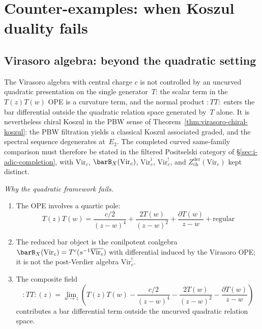 
\section{Counter-examples: when Koszul duality fails}
\label{sec:counter-examples}

\subsection{Virasoro algebra: beyond the quadratic setting}
\label{subsec:virasoro-non-example}

\begin{remark}
The Virasoro algebra with central charge $c$ is not controlled by an
uncurved quadratic presentation on the single generator~$T$: the scalar
term in the $T(z)T(w)$ OPE is a curvature term, and the normal product
$:TT:$ enters the bar differential outside the quadratic relation space
generated by~$T$ alone. It is nevertheless chiral Koszul in the PBW
sense of Theorem~\ref{thm:virasoro-chiral-koszul}: the PBW filtration
yields a classical Koszul associated graded, and the spectral sequence
degenerates at~$E_2$. The completed curved same-family comparison must
therefore be stated in the filtered Positselski category of
\S\ref{sec:i-adic-completion}, with
$\mathrm{Vir}_c$, $\barB_X(\mathrm{Vir}_c)$,
$\mathrm{Vir}_c^{\mathrm i}$, $\mathrm{Vir}_c^!$, and
$Z^{\mathrm{der}}_{\mathrm{ch}}(\mathrm{Vir}_c)$ kept distinct.

\emph{Why the quadratic framework fails.}
\begin{enumerate}
\item The OPE involves a quartic pole:
\begin{equation}
T(z)T(w) = \frac{c/2}{(z-w)^4} + \frac{2T(w)}{(z-w)^2} + \frac{\partial T(w)}{z-w} + \text{regular}
\end{equation}

\item The reduced bar object is the conilpotent coalgebra
$\barB_X(\mathrm{Vir}_c)=T^c(s^{-1}\overline{\mathrm{Vir}_c})$ with
differential induced by the Virasoro OPE; it is not the post-Verdier
algebra $\mathrm{Vir}_c^!$.

\item The composite field
\begin{equation}
:TT:(z) = \lim_{w \to z} \left( T(z)T(w) - \frac{c/2}{(z-w)^4} - \frac{2T(w)}{(z-w)^2} - \frac{\partial T(w)}{z-w} \right)
\end{equation}
contributes a bar differential term outside the uncurved quadratic
relation space.


\end{enumerate}
\end{remark}
